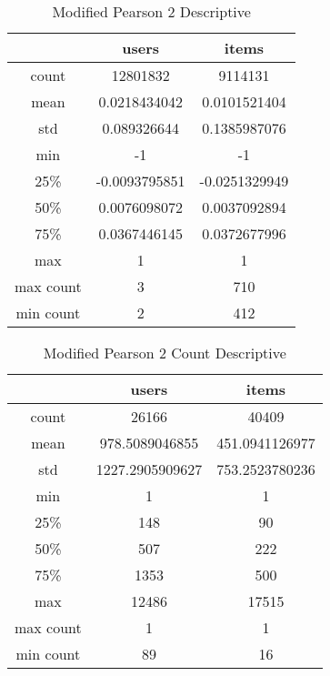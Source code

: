 \begin{table}[H]
\centering
\caption{Modified Pearson 2 Descriptive}
\label{table:modified_pearson_2_descriptive}
\begin{tabular}{|c|c|c|}
\hline
          & \textbf{users} & \textbf{items} \\ \hline
count     & 12801832       & 9114131        \\ \hline
mean      & 0.0218434042   & 0.0101521404   \\ \hline
std       & 0.089326644    & 0.1385987076   \\ \hline
min       & -1             & -1             \\ \hline
25\%      & -0.0093795851  & -0.0251329949  \\ \hline
50\%      & 0.0076098072   & 0.0037092894   \\ \hline
75\%      & 0.0367446145   & 0.0372677996   \\ \hline
max       & 1              & 1              \\ \hline
max count & 3              & 710            \\ \hline
min count & 2              & 412            \\ \hline
\end{tabular}
\end{table}

\begin{table}[H]
\centering
\caption{Modified Pearson 2 Count Descriptive}
\label{table:modified_pearson_2_count_descriptive}
\begin{tabular}{|c|c|c|}
\hline
          & \textbf{users}  & \textbf{items} \\ \hline
count     & 26166           & 40409          \\ \hline
mean      & 978.5089046855  & 451.0941126977 \\ \hline
std       & 1227.2905909627 & 753.2523780236 \\ \hline
min       & 1               & 1              \\ \hline
25\%      & 148             & 90             \\ \hline
50\%      & 507             & 222            \\ \hline
75\%      & 1353            & 500            \\ \hline
max       & 12486           & 17515          \\ \hline
max count & 1               & 1              \\ \hline
min count & 89              & 16             \\ \hline
\end{tabular}
\end{table}

